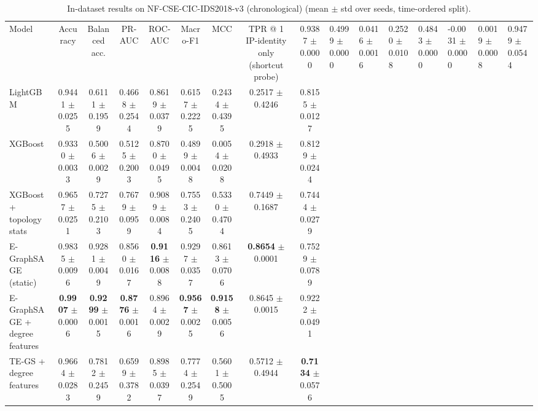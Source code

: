 \begin{table}[t]
\centering
\caption{In-dataset results on NF-CSE-CIC-IDS2018-v3 (chronological) (mean $\pm$ std over seeds, time-ordered split).}
\begin{tabular}{lcccccccc}
\toprule
Model & Accuracy & Balanced acc. & PR-AUC & ROC-AUC & Macro-F1 & MCC & TPR @ 1%
\midrule
IP-identity only (shortcut probe) & 0.9387 {\scriptsize $\pm$ 0.0000} & 0.4999 {\scriptsize $\pm$ 0.0000} & 0.0416 {\scriptsize $\pm$ 0.0016} & 0.2520 {\scriptsize $\pm$ 0.0108} & 0.4843 {\scriptsize $\pm$ 0.0000} & -0.0031 {\scriptsize $\pm$ 0.0000} & 0.0019 {\scriptsize $\pm$ 0.0008} & 0.9479 {\scriptsize $\pm$ 0.0544} \\
LightGBM & 0.9441 {\scriptsize $\pm$ 0.0255} & 0.6111 {\scriptsize $\pm$ 0.1959} & 0.4668 {\scriptsize $\pm$ 0.2544} & 0.8619 {\scriptsize $\pm$ 0.0379} & 0.6157 {\scriptsize $\pm$ 0.2225} & 0.2434 {\scriptsize $\pm$ 0.4395} & 0.2517 {\scriptsize $\pm$ 0.4246} & 0.8155 {\scriptsize $\pm$ 0.0127} \\
XGBoost & 0.9330 {\scriptsize $\pm$ 0.0033} & 0.5006 {\scriptsize $\pm$ 0.0029} & 0.5125 {\scriptsize $\pm$ 0.2003} & 0.8700 {\scriptsize $\pm$ 0.0495} & 0.4899 {\scriptsize $\pm$ 0.0048} & 0.0054 {\scriptsize $\pm$ 0.0208} & 0.2918 {\scriptsize $\pm$ 0.4933} & 0.8129 {\scriptsize $\pm$ 0.0244} \\
XGBoost + topology stats & 0.9657 {\scriptsize $\pm$ 0.0251} & 0.7275 {\scriptsize $\pm$ 0.2103} & 0.7679 {\scriptsize $\pm$ 0.0959} & 0.9089 {\scriptsize $\pm$ 0.0084} & 0.7553 {\scriptsize $\pm$ 0.2405} & 0.5330 {\scriptsize $\pm$ 0.4704} & 0.7449 {\scriptsize $\pm$ 0.1687} & 0.7444 {\scriptsize $\pm$ 0.0279} \\
E-GraphSAGE (static) & 0.9835 {\scriptsize $\pm$ 0.0096} & 0.9281 {\scriptsize $\pm$ 0.0049} & 0.8560 {\scriptsize $\pm$ 0.0167} & \textbf{0.9116} {\scriptsize $\pm$ 0.0088} & 0.9297 {\scriptsize $\pm$ 0.0357} & 0.8613 {\scriptsize $\pm$ 0.0706} & \textbf{0.8654} {\scriptsize $\pm$ 0.0001} & 0.7529 {\scriptsize $\pm$ 0.0789} \\
E-GraphSAGE + degree features & \textbf{0.9907} {\scriptsize $\pm$ 0.0006} & \textbf{0.9299} {\scriptsize $\pm$ 0.0015} & \textbf{0.8776} {\scriptsize $\pm$ 0.0016} & 0.8964 {\scriptsize $\pm$ 0.0029} & \textbf{0.9567} {\scriptsize $\pm$ 0.0025} & \textbf{0.9158} {\scriptsize $\pm$ 0.0056} & 0.8645 {\scriptsize $\pm$ 0.0015} & 0.9222 {\scriptsize $\pm$ 0.0491} \\
TE-GS + degree features & 0.9664 {\scriptsize $\pm$ 0.0283} & 0.7812 {\scriptsize $\pm$ 0.2459} & 0.6599 {\scriptsize $\pm$ 0.3782} & 0.8985 {\scriptsize $\pm$ 0.0397} & 0.7774 {\scriptsize $\pm$ 0.2549} & 0.5601 {\scriptsize $\pm$ 0.5005} & 0.5712 {\scriptsize $\pm$ 0.4944} & \textbf{0.7134} {\scriptsize $\pm$ 0.0576} \\
\bottomrule
\end{tabular}
\end{table}